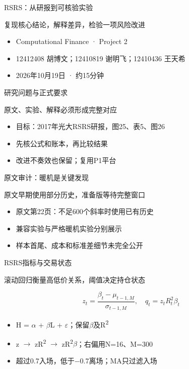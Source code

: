 \documentclass[aspectratio=169,10pt]{beamer}
\begin{document}
\begin{frame}{RSRS：从研报到可核验实验}
\begin{block}{}复现核心结论，解释差异，检验一项风险改进\end{block}
\par\vspace{3mm}
\small\begin{itemize}
\item Computational Finance · Project 2
\item 12412408 胡博文；12410819 谢明飞；12410436 王天希
\item 2026年10月19日 · 约15分钟
\end{itemize}
\end{frame}
\begin{frame}{研究问题与正式要求}
\begin{block}{}原文、实验、解释必须形成完整对应\end{block}
\small\begin{itemize}
\item 目标：2017年光大RSRS研报，图25、表5、图26
\item 先核公式和账本，再比较结果
\item 改进不奏效也保留；复用P1平台
\end{itemize}
\end{frame}
\begin{frame}{原文审计：暖机是关键发现}
\begin{block}{}原文早期使用部分历史，准备版等待完整窗口\end{block}
\small\begin{itemize}
\item 原文第22页：不足600个斜率时使用已有历史
\item 兼容实验与严格暖机实验分别展示
\item 样本首尾、成本和标准差细节未完全公开
\end{itemize}
\end{frame}
\begin{frame}{RSRS指标与交易状态}
\begin{block}{}滚动回归衡量高低价关系，阈值决定持仓状态\end{block}
\[z_t=\frac{\beta_t-\mu_{t-1,M}}{\sigma_{t-1,M}},\quad q_t=z_tR_t^2\beta_t\]
\small\begin{itemize}
\item H = \ensuremath{\alpha} + \ensuremath{\beta}L + \ensuremath{\varepsilon}；保留\ensuremath{\beta}及R\textsuperscript{2}
\item z \ensuremath{\to} zR\textsuperscript{2} \ensuremath{\to} zR\textsuperscript{2}\ensuremath{\beta}；右偏用N=16、M=300
\item 超过0.7入场，低于\ensuremath{-}0.7离场；MA只过滤入场
\end{itemize}
\end{frame}
\end{document}
